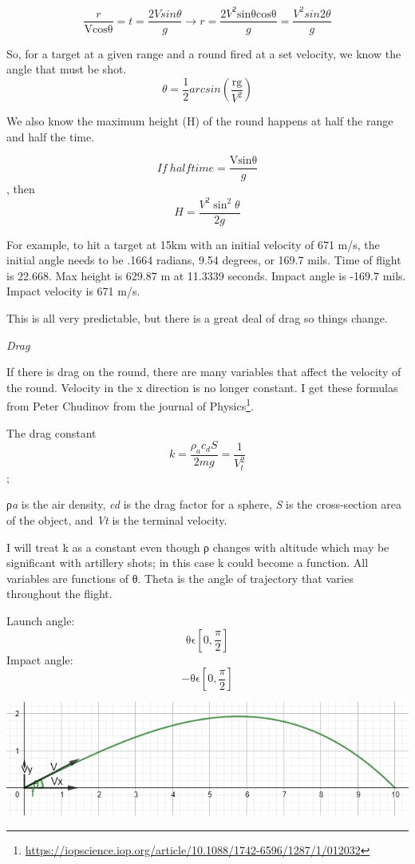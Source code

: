 \documentclass[
]{article}
\begin{document}
\[\frac{r}{\text{Vcosθ}} = t = \frac{2Vsin\theta}{g} \rightarrow r =
\frac{2V^{2}\text{sinθcosθ}}{g} = \frac{V^{2}sin2\theta}{g}\]

So, for a target at a given range and a round fired at a set velocity,
we know the angle that must be shot. \[\theta = \frac{1}{2}arcsin\left(
\frac{\text{rg}}{V^{2}} \right)\]

We also know the maximum height (H) of the round happens at half the
range and half the time.

\[If\ halftime = \frac{\text{Vsinθ}}{g}\] , then
\[H =\frac{V^{2}\sin^{2}\theta}{2g}\]

For example, to hit a target at 15km with an initial velocity of 671
m/s, the initial angle needs to be .1664 radians, 9.54 degrees, or 169.7
mils. Time of flight is 22.668. Max height is 629.87 m at 11.3339
seconds. Impact angle is -169.7 mils. Impact velocity is 671 m/s.

This is all very predictable, but there is a great deal of drag so
things change.

\emph{Drag}

If there is drag on the round, there are many variables that affect the
velocity of the round. Velocity in the x direction is no longer
constant. I get these formulas from Peter Chudinov from the journal of
Physics\footnote{\url{https://iopscience.iop.org/article/10.1088/1742-6596/1287/1/012032}}.

The drag constant
\[k = \frac{\rho_{a}c_{d}S}{2mg} = \frac{1}{V_{t}^{2}}\];

ρ\emph{a} is the air density, \emph{cd} is the drag factor for a sphere,
\emph{S} is the cross-section area of the object, and \emph{Vt} is the
terminal velocity.

I will treat k as a constant even though ρ changes with altitude which
may be significant with artillery shots; in this case k could become a
function. All variables are functions of θ. Theta is the angle of
trajectory that varies throughout the flight.

Launch angle: \[\text{θϵ}\left\lbrack 0,\frac{\pi}{2} \right\rbrack\]
Impact angle: \[- \text{θϵ}\left\lbrack 0,\frac{\pi}{2} \right\rbrack\]

\includegraphics{media/09aa336ef56776834ee2eced9ecb01ff.png}
\end{document}
